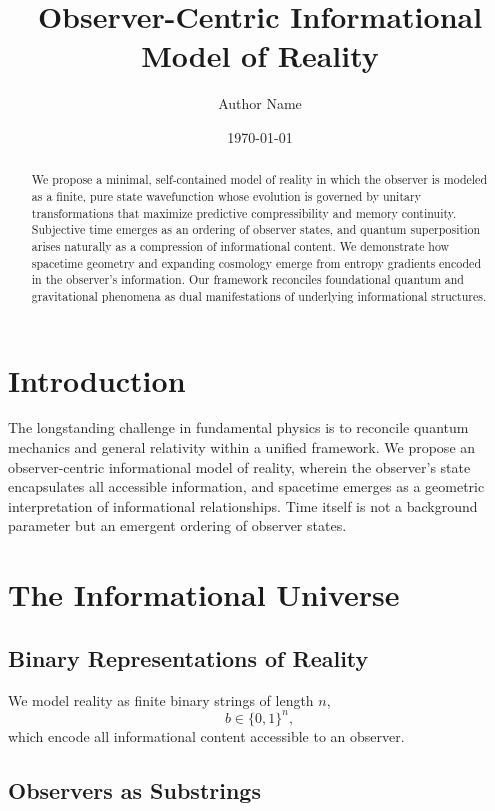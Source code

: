 \documentclass[12pt]{article}
\title{Observer-Centric Informational Model of Reality}
\author{Author Name}
\date{\today}
\begin{document}
\maketitle

\begin{abstract}
      We propose a minimal, self-contained model of reality in which the observer is modeled as a finite, pure state wavefunction whose evolution is governed by unitary transformations that maximize predictive compressibility and memory continuity. Subjective time emerges as an ordering of observer states, and quantum superposition arises naturally as a compression of informational content. We demonstrate how spacetime geometry and expanding cosmology emerge from entropy gradients encoded in the observer's information. Our framework reconciles foundational quantum and gravitational phenomena as dual manifestations of underlying informational structures.
\end{abstract}

\section{Introduction}

The longstanding challenge in fundamental physics is to reconcile quantum mechanics and general relativity within a unified framework. We propose an observer-centric informational model of reality, wherein the observer's state encapsulates all accessible information, and spacetime emerges as a geometric interpretation of informational relationships. Time itself is not a background parameter but an emergent ordering of observer states.

\section{The Informational Universe}

\subsection{Binary Representations of Reality}

We model reality as finite binary strings of length \(n\),
\[
      b \in \{0,1\}^n,
\]
which encode all informational content accessible to an observer.

\subsection{Observers as Substrings}
\end{document}
